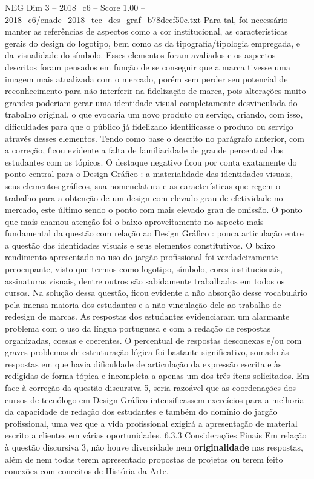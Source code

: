 \begin{textsample}{NEG Dim 3 – 2018\_c6 – Score 1.00 – 2018\_c6/enade\_2018\_tec\_des\_graf\_b78dccf50c.txt}
Para tal, foi necessário manter as referências de aspectos como a cor institucional, as características gerais do design do logotipo, bem como as da tipografia/tipologia empregada, e da visualidade do símbolo.
Esses elementos foram avaliados e os aspectos descritos foram pensados em função de se conseguir que a marca tivesse uma imagem mais atualizada com o mercado, porém sem perder seu potencial de reconhecimento para não interferir na fidelização de marca, pois alterações muito grandes poderiam gerar uma identidade visual completamente desvinculada do trabalho original, o que evocaria um novo produto ou serviço, criando, com isso, dificuldades para que o público já fidelizado identificasse o produto ou serviço através desses elementos.
Tendo como base o descrito no parágrafo anterior, com a correção, ficou evidente a falta de familiaridade de grande percentual dos estudantes com os tópicos.
O destaque negativo ficou por conta exatamente do ponto central para o Design Gráfico : a materialidade das identidades visuais, seus elementos gráficos, sua nomenclatura e as características que regem o trabalho para a obtenção de um design com elevado grau de efetividade no mercado, este último sendo o ponto com mais elevado grau de omissão.
O ponto que mais chamou atenção foi o baixo aproveitamento no aspecto mais fundamental da questão com relação ao Design Gráfico : pouca articulação entre a questão das identidades visuais e seus elementos constitutivos.
O baixo rendimento apresentado no uso do jargão profissional foi verdadeiramente preocupante, visto que termos como logotipo, símbolo, cores institucionais, assinaturas visuais, dentre outros são sabidamente trabalhados em todos os cursos.
Na solução dessa questão, ficou evidente a não absorção desse vocabulário pela imensa maioria dos estudantes e a não vinculação dele ao trabalho de redesign de marcas.
As respostas dos estudantes evidenciaram um alarmante problema com o uso da língua portuguesa e com a redação de respostas organizadas, coesas e coerentes.
O percentual de respostas desconexas e/ou com graves problemas de estruturação lógica foi bastante significativo, somado às respostas em que havia dificuldade de articulação da expressão escrita e às redigidas de forma tópica e incompleta a apenas um dos três itens solicitados.
Em face à correção da questão discursiva 5, seria razoável que as coordenações dos cursos de tecnólogo em Design Gráfico intensificassem exercícios para a melhoria da capacidade de redação dos estudantes e também do domínio do jargão profissional, uma vez que a vida profissional exigirá a apresentação de material escrito a clientes em várias oportunidades. 6.3.3 Considerações Finais Em relação à questão discursiva 3, não houve diversidade nem \textbf{originalidade} nas respostas, além de nem todas terem apresentado propostas de projetos ou terem feito conexões com conceitos de História da Arte.

\end{textsample}
